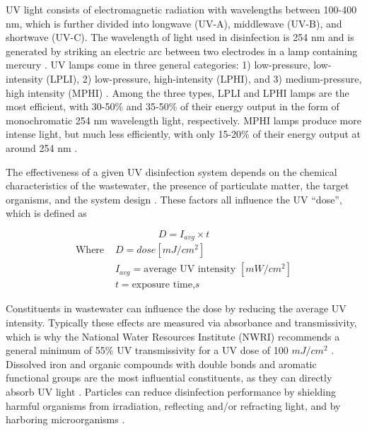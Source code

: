 \documentclass[11pt,letterpaper,final]{report}
\begin{document}
UV light consists of electromagnetic radiation with wavelengths between 100-400 nm, which is further divided into longwave (UV-A), middlewave (UV-B), and shortwave (UV-C). The wavelength of light used in disinfection is 254 nm and is generated by striking an electric arc between two electrodes in a lamp containing mercury \cite{ELShahawy2019}. UV lamps come in three general categories: 1) low-pressure, low-intensity (LPLI), 2) low-pressure, high-intensity (LPHI), and 3) medium-pressure, high intensity (MPHI) \cite{Metcalf}. Among the three types, LPLI and LPHI lamps are the most efficient, with 30-50\% and 35-50\% of their energy output in the form of monochromatic 254 nm wavelength light, respectively. MPHI lamps produce more intense light, but much less efficiently, with only 15-20\% of their energy output at around 254 nm \cite{Metcalf}.

The effectiveness of a given UV disinfection system depends on the chemical characteristics of the wastewater, the presence of particulate matter, the target organisms, and the system design \cite{Metcalf}. These factors all influence the UV ``dose'', which is defined as



\setlength{\parskip}{0pt}
\begin{equation}
   D=I_{avg} \times t
 \end{equation}
 \begin{align*}
   \text{Where }&D= dose [mJ/cm^2]\\
   & I_{avg}= \text{average UV intensity }[mW/cm^2]\\
   & t=\text{exposure time,} s
 \end{align*}

 \setlength{\parskip}{\baselineskip}

Constituents in wastewater can influence the dose by reducing the average UV intensity. Typically these effects are measured via absorbance and transmissivity, which is why the National Water Resources Institute (NWRI) recommends a general minimum of 55\% UV transmissivity for a UV dose of 100 $mJ/cm^2$ \cite{NPDES}. Dissolved iron and organic compounds with double bonds and aromatic functional groups are the most influential constituents, as they can directly absorb UV light \cite{Metcalf}. Particles can reduce disinfection performance by shielding harmful organisms from irradiation, reflecting and/or refracting light, and by harboring microorganisms \cite{Metcalf}.
\end{document}
